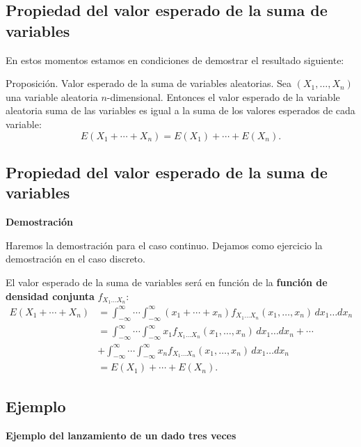 \documentclass[]{book}
\begin{document}
\hypertarget{propiedad-del-valor-esperado-de-la-suma-de-variables}{%
\subsection{Propiedad del valor esperado de la suma de variables}\label{propiedad-del-valor-esperado-de-la-suma-de-variables}}

En estos momentos estamos en condiciones de demostrar el resultado siguiente:

Proposición. Valor esperado de la suma de variables aleatorias.
Sea \((X_1,\ldots,X_n)\) una variable aleatoria \(n\)-dimensional. Entonces el valor esperado de la variable aleatoria suma de las variables es igual a la suma de los valores esperados de cada variable:
\[
E(X_1+\cdots + X_n)=E(X_1)+\cdots + E(X_n).
\]

\hypertarget{propiedad-del-valor-esperado-de-la-suma-de-variables-1}{%
\subsection{Propiedad del valor esperado de la suma de variables}\label{propiedad-del-valor-esperado-de-la-suma-de-variables-1}}

\textbf{Demostración}

Haremos la demostración para el caso continuo. Dejamos como ejercicio la demostración en el caso discreto.

El valor esperado de la suma de variables será en función de la \textbf{función de densidad conjunta} \(f_{X_1\ldots X_n}\):
\[
\begin{array}{rl}
E(X_1+\cdots + X_n) & = \int_{-\infty}^\infty\cdots\int_{-\infty}^\infty (x_1+\cdots + x_n)f_{X_1\ldots X_n}(x_1,\ldots,x_n)\,dx_1\ldots dx_n \\ & = \int_{-\infty}^\infty\cdots\int_{-\infty}^\infty x_1f_{X_1\ldots X_n}(x_1,\ldots,x_n)\,dx_1\ldots dx_n+ \cdots \\ & + \int_{-\infty}^\infty\cdots\int_{-\infty}^\infty x_n f_{X_1\ldots X_n}(x_1,\ldots,x_n)\,dx_1\ldots dx_n \\ & = E(X_1)+\cdots + E(X_n).
\end{array}
\]

\hypertarget{ejemplo-129}{%
\subsection{Ejemplo}\label{ejemplo-129}}

\textbf{Ejemplo del lanzamiento de un dado tres veces}
\end{document}
